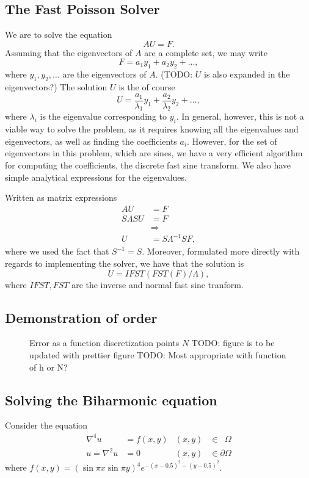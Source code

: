 \subsection{The Fast Poisson Solver}
We are to solve the equation
$$
A U = F.
$$
Assuming that the eigenvectors of $A$ are a complete set, we may write
$$
F = a_1 y_1 + a_2 y_2 + ...,
$$
where $y_1, y_2, \dots$ are the eigenvectors of $A$.
(TODO: $U$ is also expanded in the eigenvectors?)
The solution $U$ is the of course
$$
U =
\frac{a_1}{\lambda_1} y_1
+ \frac{a_2}{\lambda_2} y_2
+ \dots,
$$
where $\lambda_i$ is the eigenvalue corresponding to $y_i$.
In general, however, this is not a viable way to solve the problem, as it requires knowing all the eigenvalues and eigenvectors, as well as finding the coefficients $a_i$.
However, for the set of eigenvectors in this problem, which are sines, we have a very efficient algorithm for computing the coefficients, the discrete fast sine transform.
We also have simple analytical expressions for the eigenvalues.

Written as matrix expressions
\begin{align}
  A U &= F\\
  S\Lambda S U &= F\\
  &\Rightarrow\\
  U &= S\Lambda^{-1} S F,
\end{align}
where we used the fact that $S^{-1} = S$.
Moreover, formulated more directly with regards to implementing the solver, we have that the solution is
$$
U = IFST(FST(F) / \Lambda),
$$
where $IFST, FST$ are the inverse and normal fast sine tranform.

\subsection{Demonstration of order}
\begin{figure}[h]
  \centering
  
  \caption{Error as a function discretization points $N$
    TODO: figure is to be updated with prettier figure
    TODO: Most appropriate with function of h or N?}
\end{figure}


\subsection{Solving the Biharmonic equation}
Consider the equation
\begin{align*}
  \nabla^4 u &= f(x, y) &(x, y) &\in \phantom{\partial}\Omega\\
  u = \nabla^2u &= 0  &(x, y) &\in \partial\Omega
\end{align*}
where $f(x, y) =
\left(
\sin \pi x
\sin \pi y
\right)^4
e^{-(x-0.5)^2 - (y-0.5)^2}
$.

